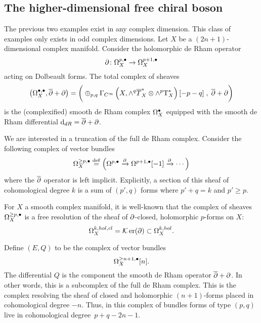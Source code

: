 \documentclass[11pt]{amsart}
\renewcommand{\op}{\operatorname}
\begin{document}



\subsection{The higher-dimensional free chiral boson}

The previous two examples exist in any complex dimension.
This class of examples only exists in odd complex dimensions.
Let $X$ be a $(2n+1)$-dimensional complex manifold.
Consider the holomorphic de Rham operator
\begin{equation}
\partial \colon \Omega^{p,\bullet}_X \to \Omega^{p+1,\bullet}_X
\end{equation}
acting on Dolbeault forms.
The total complex of sheaves
\begin{equation}
\left(\Omega^{\bullet,\bullet}_X , \overline{\partial} + \partial\right) = \bigg(\oplus_{p,q} \Gamma_{C^\infty}\left(X, \wedge^q \overline T^*_X \otimes \wedge^p {\rm T}^*_X\right) [-p-q] \; , \; \overline{\partial} + \partial \bigg) 
\end{equation}
is the (complexified) smooth de Rham complex $\Omega^\bullet_X$ equipped with the smooth de Rham differential ${\rm d}_{dR} = \overline{\partial} + \partial$.

We are interested in a truncation of the full de Rham complex.
Consider the following complex of vector bundles
\begin{equation}
\Omega^{\geq p, \bullet}_X \overset{\rm def}{=} \left(\Omega^{p,\bullet} \xrightarrow{\partial} \Omega^{p+1,\bullet}[-1] \xrightarrow{\partial} \cdots \right) 
\end{equation}
where the $\overline{\partial}$ operator is left implicit.
Explicitly, a section of this sheaf of cohomological degree $k$ is a sum of $(p',q)$ forms where $p' + q = k$ and $p' \geq p$.

For $X$ a smooth complex manifold, it is well-known that the complex of sheaves $\Omega^{\geq p, \bullet}_X$ is a free resolution of the sheaf of $\partial$-closed, holomorphic $p$-forms on $X$:
\begin{equation}
\Omega^{k,hol,cl}_X = \cK\op{er} (\del) \subset \Omega^{k,hol}_X .
\end{equation}

Define $(E,Q)$ to be the complex of vector bundles
\begin{equation}
\Omega^{\geq n+1, \bullet}_X [n] .
\end{equation}
The differential $Q$ is the component the smooth de Rham operator $\overline{\partial} + \partial$.
In other words, this is a subcomplex of the full de Rham complex.
This is the complex resolving the sheaf of closed and holomorphic $(n+1)$-forms placed in cohomological degree $-n$.
Thus, in this complex of bundles forms of type $(p,q)$ live in cohomological degree~$p+q-2n-1$.
\end{document}
